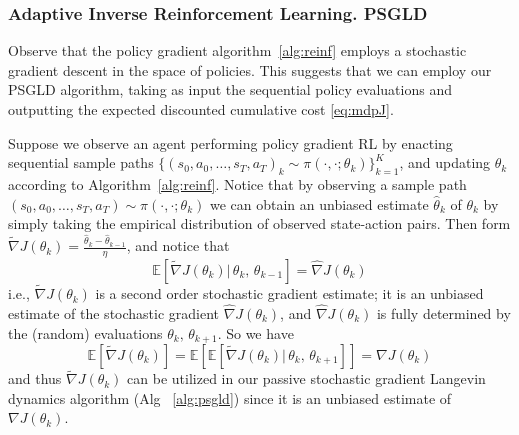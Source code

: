 \documentclass[journal,onecolumn]{IEEEtran}
\newcommand{\thk}{\theta_k}
\newcommand{\thkk}{\theta_{k+1}}
\newcommand{\thkm}{\theta_{k-1}}
\newcommand{\grad}{\nabla}
\newcommand{\gradn}{\hat{\nabla}}
\newcommand{\reals}{\mathbb{R}}
\newcommand{\CE}{\mathbb{E}}
\begin{document}

\subsubsection{Adaptive Inverse Reinforcement Learning. PSGLD}
Observe that the policy gradient algorithm~\eqref{alg:reinf} employs a stochastic gradient descent in the space of policies. This suggests that we can employ our PSGLD algorithm, taking as input the sequential policy evaluations and outputting the expected discounted cumulative cost \eqref{eq:mdpJ}. 

Suppose we observe an agent performing policy gradient RL by enacting sequential sample paths $\{(s_0,a_0, \dots,s_T,a_T)_k \sim \pi(\cdot,\cdot;\theta_k)\}_{k=1}^K$, and updating $\theta_k$ according to Algorithm~\ref{alg:reinf}. Notice that by observing a sample path $(s_0,a_0,\dots,s_T,a_T) \sim \pi(\cdot,\cdot;\theta_k)$ we can obtain an unbiased estimate {\color{black}$\hat{\theta}_k$ of $\theta_k$} by simply taking the empirical distribution of observed state-action pairs. Then form 
$\tilde{\grad} J(\theta_k) = \frac{\hat{\theta}_{k} - \hat{\theta}_{k-1}}{\eta}$, and notice that 
\[\CE\left[\tilde{\grad}J(\thk) |\, \thk,\,\thkm \right] = \gradn J(\thk) \]
i.e., $\tilde{\grad}J(\thk)$ is a second order stochastic gradient estimate; it is an unbiased estimate of the stochastic gradient $\gradn J(\thk)$, and $\gradn J(\thk)$ is fully determined by the (random) evaluations $\thk,\,\thkk$.  So we have 
\[\CE\left[\tilde{\grad}J(\thk)\right] = \CE\left[\CE\left[\tilde{\grad}J(\thk) | \,\thk,\,\thkk \right] \right] = \grad J(\thk)\]
and thus $\tilde{\grad}J(\thk)$ can be utilized in our passive stochastic gradient Langevin dynamics algorithm (Alg ~\ref{alg:psgld}) since it is an unbiased estimate of $\grad J(\thk)$. 
\end{document}
